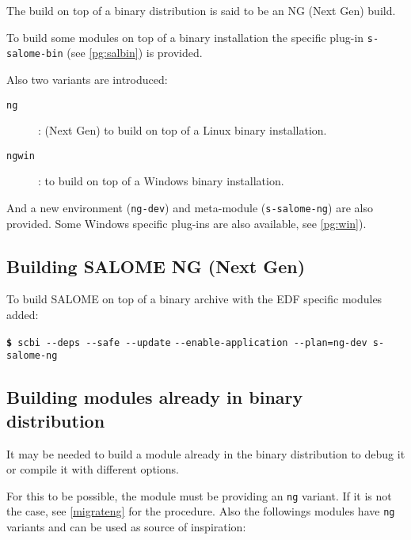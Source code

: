 \documentclass[a4paper,12pt,twoside]{article}
\newcommand{\code}[1]{\texttt{#1}}
\newcommand{\cmd}[1]{\tabto{1cm}\hspace{0.5cm}\texttt{\textbf{\$} #1}}
\newcommand{\cmdc}[1]{\tabto{1cm}\hspace{1.5cm}\texttt{#1}}
\newcommand{\ddash}{-{}-}
\begin{document}
The build on top of a binary distribution is said to be an NG (Next Gen) build.

To build some modules on top of a binary installation the specific plug-in \code{s-salome-bin} (see \ref{pg:salbin}) is provided.

Also two variants are introduced:

\begin{description}
	\item[\code{ng}] : (Next Gen) to build on top of a Linux binary installation.
	\item[\code{ngwin}] : to build on top of a Windows binary installation.
\end{description}

And a new environment (\code{ng-dev}) and meta-module (\code{s-salome-ng}) are also provided. Some Windows specific plug-ins are also available,  see \ref{pg:win}).

\subsection{Building SALOME NG (Next Gen)}

To build SALOME on top of a binary archive with the EDF specific modules added:

\cmd{scbi \ddash{}deps \ddash{}safe \ddash{}update}
\cmdc{\ddash{}enable-application \ddash{}plan=ng-dev s-salome-ng}

\subsection{Building modules already in binary distribution}

It may be needed to build a module already in the binary distribution to debug it or compile it with different options.

For this to be possible, the module must be providing an \code{ng} variant. If it is not the case, see \ref{migrateng} for the procedure. Also the followings modules have \code{ng} variants and can be used as source of inspiration:
\end{document}
